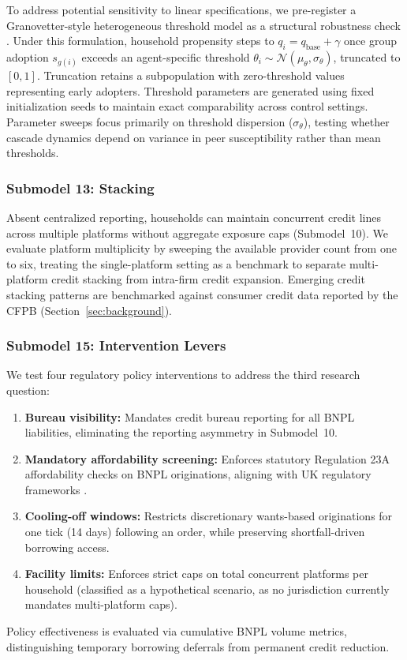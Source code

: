 To address potential sensitivity to linear specifications, we pre-register a Granovetter-style heterogeneous threshold model as a structural robustness check \cite{granovetter1978threshold}.
Under this formulation, household propensity steps to $q_i = q_{\text{base}} + \gamma$ once group adoption $s_{g(i)}$ exceeds an agent-specific threshold $\theta_i \sim \mathcal{N}(\mu_\theta, \sigma_\theta)$, truncated to $[0,1]$.
Truncation retains a subpopulation with zero-threshold values representing early adopters.
Threshold parameters are generated using fixed initialization seeds to maintain exact comparability across control settings.
Parameter sweeps focus primarily on threshold dispersion ($\sigma_\theta$), testing whether cascade dynamics depend on variance in peer susceptibility rather than mean thresholds.

\subsubsection*{Submodel 13: Stacking}
\label{sec:stacking}

Absent centralized reporting, households can maintain concurrent credit lines across multiple platforms without aggregate exposure caps (Submodel~10). We evaluate platform multiplicity by sweeping the available provider count from one to six, treating the single-platform setting as a benchmark to separate multi-platform credit stacking from intra-firm credit expansion. Emerging credit stacking patterns are benchmarked against consumer credit data reported by the \ac{CFPB} (Section~\ref{sec:background}).

\subsubsection*{Submodel 15: Intervention Levers}
\label{sec:levers}

We test four regulatory policy interventions to address the third research question:
\begin{enumerate}
\item \textbf{Bureau visibility:} Mandates credit bureau reporting for all \ac{BNPL} liabilities, eliminating the reporting asymmetry in Submodel~10.
\item \textbf{Mandatory affordability screening:} Enforces statutory Regulation 23A affordability checks on \ac{BNPL} originations, aligning with UK regulatory frameworks \cite{fca_ps26_1, woolard2021}.
\item \textbf{Cooling-off windows:} Restricts discretionary wants-based originations for one tick (14 days) following an order, while preserving shortfall-driven borrowing access.
\item \textbf{Facility limits:} Enforces strict caps on total concurrent platforms per household (classified as a hypothetical scenario, as no jurisdiction currently mandates multi-platform caps).
\end{enumerate}
Policy effectiveness is evaluated via cumulative \ac{BNPL} volume metrics, distinguishing temporary borrowing deferrals from permanent credit reduction.

